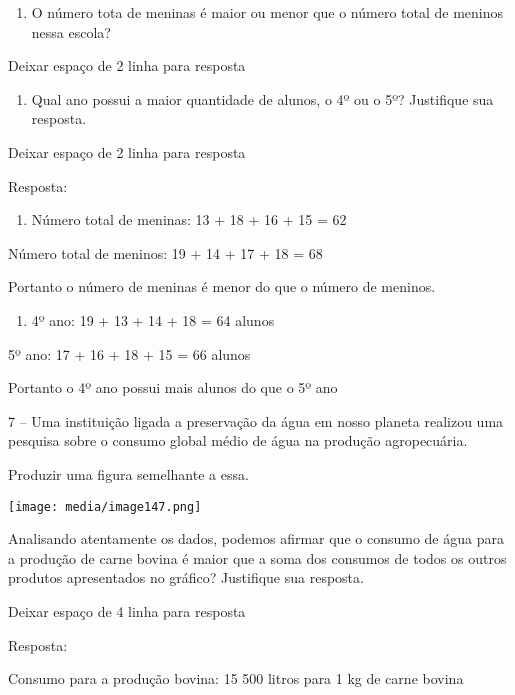\begin{enumerate}
\def\labelenumi{\alph{enumi})}
\item
  O número tota de meninas é maior ou menor que o número total de
  meninos nessa escola?
\end{enumerate}

Deixar espaço de 2 linha para resposta

\begin{enumerate}
\def\labelenumi{\alph{enumi})}
\item
  Qual ano possui a maior quantidade de alunos, o 4º ou o 5º? Justifique
  sua resposta.
\end{enumerate}

Deixar espaço de 2 linha para resposta

Resposta:

\begin{enumerate}
\def\labelenumi{\alph{enumi})}
\item
  Número total de meninas: 13 + 18 + 16 + 15 = 62
\end{enumerate}

Número total de meninos: 19 + 14 + 17 + 18 = 68

Portanto o número de meninas é menor do que o número de meninos.

\begin{enumerate}
\def\labelenumi{\alph{enumi})}
\item
  4º ano: 19 + 13 + 14 + 18 = 64 alunos
\end{enumerate}

5º ano: 17 + 16 + 18 + 15 = 66 alunos

Portanto o 4º ano possui mais alunos do que o 5º ano

7 -- Uma instituição ligada a preservação da água em nosso planeta
realizou uma pesquisa sobre o consumo global médio de água na produção
agropecuária.

Produzir uma figura semelhante a essa.

\texttt{[image: media/image147.png]}

Analisando atentamente os dados, podemos afirmar que o consumo de água
para a produção de carne bovina é maior que a soma dos consumos de todos
os outros produtos apresentados no gráfico? Justifique sua resposta.

Deixar espaço de 4 linha para resposta

Resposta:

Consumo para a produção bovina: 15 500 litros para 1 kg de carne bovina


